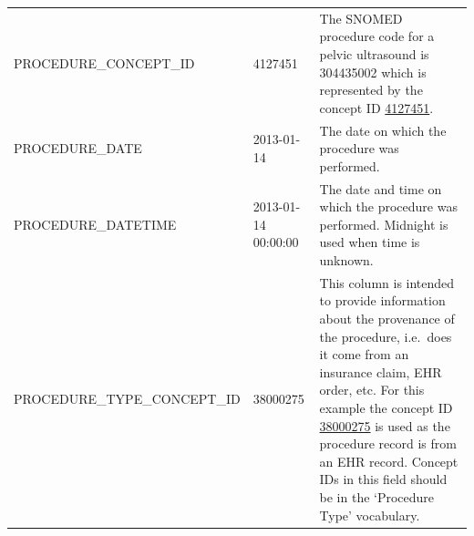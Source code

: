 \documentclass[11pt]{book}
\begin{document}
\begin{longtable}[]{@{}lll@{}}
\begin{minipage}[t]{0.36\columnwidth}
PROCEDURE\_CONCEPT\_ID\strut
\end{minipage} & \begin{minipage}[t]{0.09\columnwidth}\raggedright\strut
4127451\strut
\end{minipage} & \begin{minipage}[t]{0.46\columnwidth}\raggedright\strut
The SNOMED procedure code for a pelvic ultrasound is 304435002 which is
represented by the concept ID
\href{http://athena.ohdsi.org/search-terms/terms/4127451}{4127451}.\strut
\end{minipage}\tabularnewline
\begin{minipage}[t]{0.36\columnwidth}\raggedright\strut
PROCEDURE\_DATE\strut
\end{minipage} & \begin{minipage}[t]{0.09\columnwidth}\raggedright\strut
2013-01-14\strut
\end{minipage} & \begin{minipage}[t]{0.46\columnwidth}\raggedright\strut
The date on which the procedure was performed.\strut
\end{minipage}\tabularnewline
\begin{minipage}[t]{0.36\columnwidth}\raggedright\strut
PROCEDURE\_DATETIME\strut
\end{minipage} & \begin{minipage}[t]{0.09\columnwidth}\raggedright\strut
2013-01-14 00:00:00\strut
\end{minipage} & \begin{minipage}[t]{0.46\columnwidth}\raggedright\strut
The date and time on which the procedure was performed. Midnight is used
when time is unknown.\strut
\end{minipage}\tabularnewline
\begin{minipage}[t]{0.36\columnwidth}\raggedright\strut
PROCEDURE\_TYPE\_CONCEPT\_ID\strut
\end{minipage} & \begin{minipage}[t]{0.09\columnwidth}\raggedright\strut
38000275\strut
\end{minipage} & \begin{minipage}[t]{0.46\columnwidth}\raggedright\strut
This column is intended to provide information about the provenance of
the procedure, i.e.~does it come from an insurance claim, EHR order,
etc. For this example the concept ID
\href{http://athena.ohdsi.org/search-terms/terms/38000275}{38000275} is
used as the procedure record is from an EHR record. Concept IDs in this
field should be in the `Procedure Type' vocabulary.\strut

\end{minipage}
\end{longtable}
\end{document}
